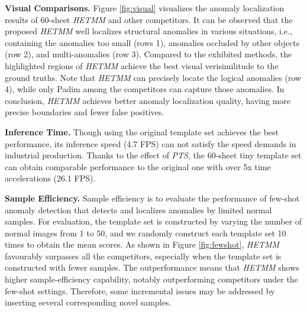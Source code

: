 \documentclass[default,iicol]{sn-jnl}\usepackage[algo2e,ruled,linesnumbered]{algorithm2e}
\theoremstyle{thmstyleone}\newtheorem{theorem}{Theorem}\newtheorem{proposition}[theorem]{Proposition}
\theoremstyle{thmstyletwo}\newtheorem{example}{Example}\newtheorem{remark}{Remark}
\theoremstyle{thmstylethree}\newtheorem{definition}{Definition}
\begin{document}
\noindent\textbf{Visual Comparisons. }
Figure \ref{fig:visual} visualizes the anomaly localization results of 60-sheet \textit{HETMM} and other competitors.
It can be observed that the proposed \textit{HETMM} well localizes structural anomalies in various situations, i.e., containing the anomalies too small (rows 1), anomalies occluded by other objects (row 2), and multi-anomalies (row 3).
Compared to the exhibited methods, the highlighted regions of \textit{HETMM} achieve the best visual verisimilitude to the ground truths.
Note that \textit{HETMM} can precisely locate the logical anomalies (row 4), while only Padim \cite{Padim} among the competitors can capture those anomalies.
In conclusion, \textit{HETMM} achieves better anomaly localization quality, having more precise boundaries and fewer false positives.

\noindent\textbf{Inference Time. }
Though using the original template set achieves the best performance, its inference speed (4.7 FPS) can not satisfy the speed demands in industrial production.
Thanks to the effect of \textit{PTS}, the 60-sheet tiny template set can obtain comparable performance to the original one with over 5x time accelerations (26.1 FPS).

\noindent\textbf{Sample Efficiency. }
Sample efficiency is to evaluate the performance of few-shot anomaly detection that detects and localizes anomalies by limited normal samples.
For evaluation, the template set is constructed by varying the number of normal images from 1 to 50, and we randomly construct each template set 10 times to obtain the mean scores.
As shown in Figure \ref{fig:fewshot}, \textit{HETMM} favourably surpasses all the competitors, especially when the template set is constructed with fewer samples.
The outperformance means that \textit{HETMM} shows higher sample-efficiency capability, notably outperforming competitors under the few-shot settings.
Therefore, some incremental issues may be addressed by inserting several corresponding novel samples.
\end{document}
